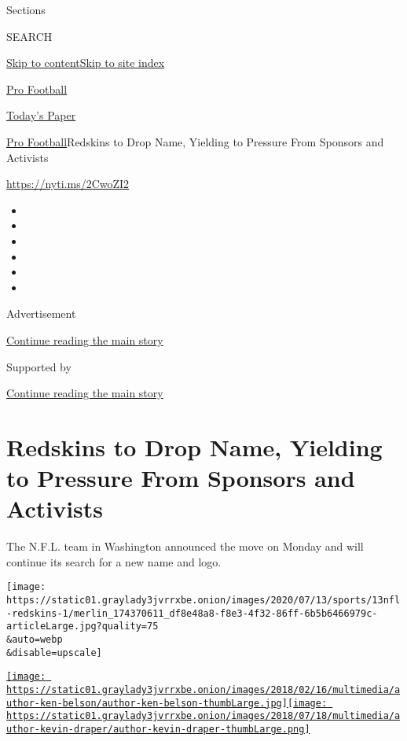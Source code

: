 Sections

SEARCH

\protect\hyperlink{site-content}{Skip to
content}\protect\hyperlink{site-index}{Skip to site index}

\href{https://www.nytimes3xbfgragh.onion/section/sports/football}{Pro
Football}

\href{https://myaccount.nytimes3xbfgragh.onion/auth/login?response_type=cookie\&client_id=vi}{}

\href{https://www.nytimes3xbfgragh.onion/section/todayspaper}{Today's
Paper}

\href{/section/sports/football}{Pro Football}\textbar{}Redskins to Drop
Name, Yielding to Pressure From Sponsors and Activists

\url{https://nyti.ms/2CwoZI2}

\begin{itemize}
\item
\item
\item
\item
\item
\item
\end{itemize}

Advertisement

\protect\hyperlink{after-top}{Continue reading the main story}

Supported by

\protect\hyperlink{after-sponsor}{Continue reading the main story}

\hypertarget{redskins-to-drop-name-yielding-to-pressure-from-sponsors-and-activists}{%
\section{Redskins to Drop Name, Yielding to Pressure From Sponsors and
Activists}\label{redskins-to-drop-name-yielding-to-pressure-from-sponsors-and-activists}}

The N.F.L. team in Washington announced the move on Monday and will
continue its search for a new name and logo.

\texttt{[image: https://static01.graylady3jvrrxbe.onion/images/2020/07/13/sports/13nfl-redskins-1/merlin\_174370611\_df8e48a8-f8e3-4f32-86ff-6b5b6466979c-articleLarge.jpg?quality=75\\\&auto=webp\\\&disable=upscale]}

\href{https://www.nytimes3xbfgragh.onion/by/ken-belson}{\texttt{[image: https://static01.graylady3jvrrxbe.onion/images/2018/02/16/multimedia/author-ken-belson/author-ken-belson-thumbLarge.jpg]}}\href{https://www.nytimes3xbfgragh.onion/by/kevin-draper}{\texttt{[image: https://static01.graylady3jvrrxbe.onion/images/2018/07/18/multimedia/author-kevin-draper/author-kevin-draper-thumbLarge.png]}}

